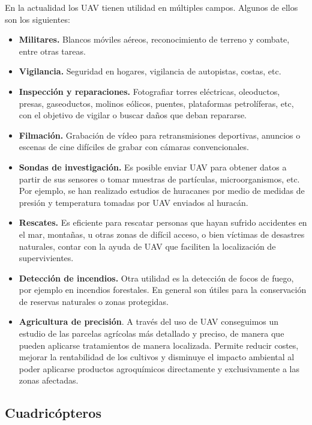 En la actualidad los UAV tienen utilidad en múltiples campos. Algunos de ellos son los siguientes:

\begin{itemize}
 \item \textbf{Militares.} Blancos móviles aéreos, reconocimiento de terreno y combate, entre otras tareas. 
 \item \textbf{Vigilancia.} Seguridad en hogares, vigilancia de autopistas, costas, etc. 
 \item \textbf{Inspección y reparaciones.} Fotografiar torres eléctricas, oleoductos, presas, gaseoductos, molinos eólicos, puentes, plataformas petrolíferas, etc, con el objetivo de vigilar o buscar daños que deban repararse.
 \item \textbf{Filmación.} Grabación de vídeo para retransmisiones deportivas, anuncios o escenas de cine difíciles de grabar con cámaras convencionales.
 \item \textbf{Sondas de investigación.} Es posible enviar UAV para obtener datos a partir de sus sensores o tomar muestras de partículas, microorganismos, etc. Por ejemplo, se han realizado estudios de huracanes por medio de medidas de presión y temperatura tomadas por UAV enviados al huracán.
 \item \textbf{Rescates.} Es eficiente para rescatar personas que hayan sufrido accidentes en el mar, montañas, u otras zonas de difícil acceso, o bien víctimas de desastres naturales, contar con la ayuda de UAV que faciliten la localización de supervivientes.
 \item \textbf{Detección de incendios.} Otra utilidad es la detección de focos de fuego, por ejemplo en incendios forestales. En general son útiles para la conservación de reservas naturales o zonas protegidas.
 \item \textbf{Agricultura de precisión}. A través del uso de UAV conseguimos un estudio de las parcelas agrícolas más detallado y preciso, de manera que pueden aplicarse tratamientos de manera localizada. Permite reducir costes, mejorar la rentabilidad de los cultivos y disminuye el impacto ambiental al poder aplicarse productos agroquímicos directamente y exclusivamente a las zonas afectadas.
\end{itemize}


\subsection{Cuadricópteros}\label{sec:quadrotors}

